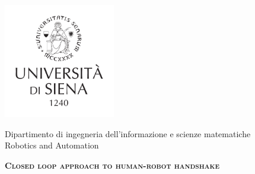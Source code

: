 \thispagestyle{empty}
\begin{center}
\includegraphics[height=5cm]{Figure/LOGO_UNISI.pdf}

\large{ \sc Dipartimento di ingegneria dell'informazione e scienze matematiche}
\vspace{0.5cm
\large Computer and Automation Engineering}\\
\vspace{0.5cm}
\large {\sc Robotics and Automation}
\vspace{1cm}
 

{\LARGE \textbf{\textsc{Closed loop approach to human-robot handshake}}}

\end{center}
%
%
%
%

